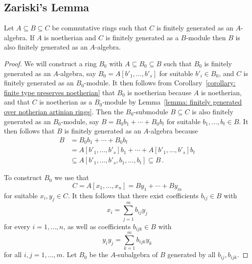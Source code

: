 \subsection{Zariski’s Lemma}
\label{subsection: Zariskis lemma}


\begin{lemma}
  \label{lemma: technical ring lemma}
  Let $A \subseteq B \subseteq C$ be commutative rings such that $C$ is finitely generated as an $A$-algebra.
  If  $A$ is noetherian and $C$ is finitely generated as a $B$-module then $B$ is also finitely generated as an $A$-algebra.
\end{lemma}


\begin{proof}
  We will construct a ring $B_0$ with $A \subseteq B_0 \subseteq B$ such that $B_0$ is finitely generated as an $A$-algebra, say $B_0 = A[b'_1, \dotsc, b'_s]$ for suitable $b'_i \in B_0$, and $C$ is finitely generated as an $B_0$-module.
  It then follows from Corollary~\ref{corollary: finite type preserves noetherian} that $B_0$ is noetherian because $A$ is noetherian, and that $C$ is noetherian as a $B_0$-module by Lemma~\ref{lemma: finitely generated over notherian artinian rings}.
  Then the $B_0$-submodule $B \subseteq C$ is also finitely generated as an $B_0$-module, say $B = B_0 b_1 + \dotsb + B_0 b_t$ for suitable $b_1, \dotsc, b_t \in B$.
  It then follows that $B$ is finitely generated as an $A$-algebra because
  \begin{align*}
                B
    &=          B_0 b_1 + \dotsb + B_0 b_t  \\
    &=          A[b'_1, \dotsc, b'_s] b_1 + \dotsb + A[b'_1, \dotsc, b'_s] b_t  \\
    &\subseteq  A[b'_1, \dotsc, b'_s, b_1, \dotsc, b_t]
     \subseteq  B \,.
  \end{align*}
  
  To construct $B_0$ we use that
  \[
      C
    = A[x_1, \dotsc, x_n]
    = B y_1 + \dotsb + B y_m
  \]
  for suitable $x_i, y_j \in C$.
  It then follows that there exist coefficients $b_{ij} \in B$ with
  \[
      x_i
    = \sum_{j=1}^m b_{ij} y_j
  \]
  for every $i = 1, \dotsc, n$, as well as coefficients $b_{ijk} \in B$ with
  \[
      y_i y_j
    = \sum_{k=1}^m b_{ijk} y_k
  \]
  for all $i,j = 1, \dotsc, m$.
  Let $B_0$ be the $A$-subalgebra of $B$ generated by all $b_{ij}, b_{ijk}$.
  

\end{proof}
